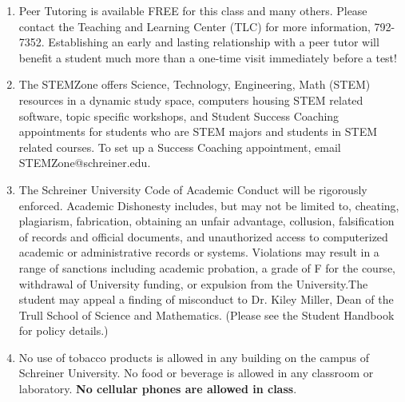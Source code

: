 \documentclass[11pt, a4paper]{article}
\begin{document}
\begin{enumerate}
\item Peer Tutoring is available FREE for this class and many others.  Please contact the Teaching and Learning Center (TLC) for more information, 792-7352.  Establishing an early and lasting relationship with a peer tutor will benefit a student much more than a one-time visit immediately before a test!

\item The STEMZone offers Science, Technology, Engineering, Math (STEM) resources in a dynamic study space, computers housing STEM related software, topic specific workshops, and Student Success Coaching appointments for students who are STEM majors and students in STEM related courses. To set up a Success Coaching appointment, email STEMZone@schreiner.edu.

\item The Schreiner University Code of Academic Conduct will be rigorously enforced. Academic Dishonesty includes, but may not be limited to, cheating, plagiarism, fabrication, obtaining an unfair advantage, collusion, falsification of records and official documents, and unauthorized access to computerized academic or administrative records or systems. Violations may result in a range of sanctions including academic probation, a grade of F for the course, withdrawal of University funding, or expulsion from the University.The student may appeal a finding of misconduct to Dr. Kiley Miller, Dean of the Trull School of Science and Mathematics. (Please see the Student Handbook for policy details.)

\item No use of tobacco products is allowed in any building on the campus of Schreiner University.  No food or beverage is allowed in any classroom or laboratory. \textbf{No cellular phones are allowed in class}.
\end{enumerate}


\newpage
\end{document}

